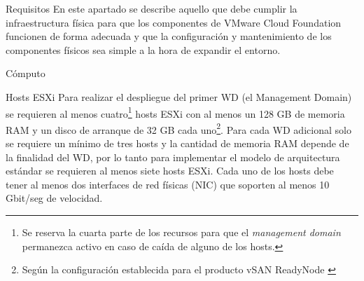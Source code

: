 \begin{section}{Requisitos}
En este apartado se describe aquello que debe cumplir la infraestructura física para que los componentes de VMware Cloud Foundation funcionen de forma adecuada y que la configuración y mantenimiento de los componentes físicos sea simple a la hora de expandir el entorno.

\begin{subsection}{Cómputo}
\begin{subsubsection}{Hosts ESXi}
    Para realizar el despliegue del primer WD (el Management Domain) se requieren al menos cuatro\footnote{Se reserva la cuarta parte de los recursos para que el \textit{management domain} permanezca activo en caso de caída de alguno de los hosts.} hosts ESXi con al menos un 128 GB de memoria RAM y un disco de arranque de 32 GB cada uno\footnote{Según la configuración establecida para el producto vSAN ReadyNode \cite{host-requirements}}. Para cada WD adicional solo se requiere un mínimo de tres hosts y la cantidad de memoria RAM depende de la finalidad del WD, por lo tanto para implementar el modelo de arquitectura estándar se requieren al menos siete hosts ESXi. Cada uno de los hosts debe tener al menos dos interfaces de red físicas (NIC) que soporten al menos 10 Gbit/seg de velocidad.
    

\end{subsubsection}
\end{subsection}
\end{section}
